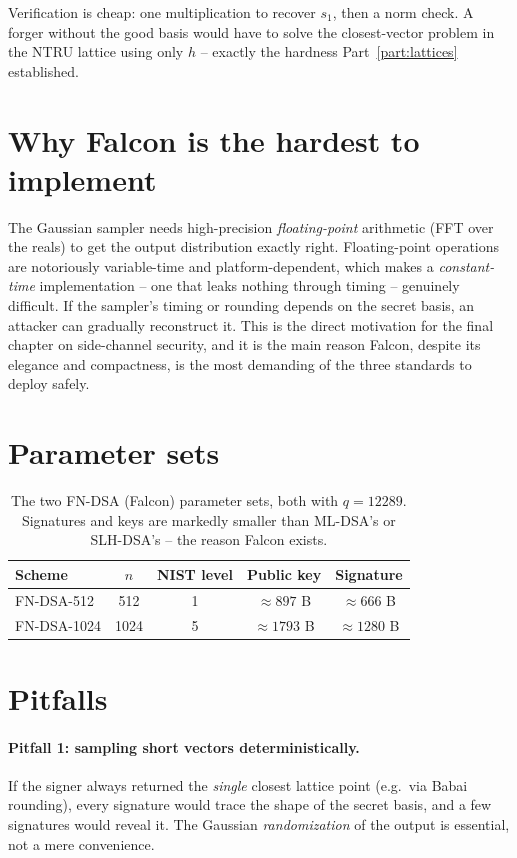 Verification is cheap: one multiplication to recover $s_1$, then a norm check. A forger without the good basis would have to solve the closest-vector problem in the NTRU lattice using only $h$ -- exactly the hardness Part~\ref{part:lattices} established.

\section{Why Falcon is the hardest to implement}

The Gaussian sampler needs high-precision \emph{floating-point} arithmetic (FFT over the reals) to get the output distribution exactly right. Floating-point operations are notoriously variable-time and platform-dependent, which makes a \emph{constant-time} implementation -- one that leaks nothing through timing -- genuinely difficult. If the sampler's timing or rounding depends on the secret basis, an attacker can gradually reconstruct it. This is the direct motivation for the final chapter on side-channel security, and it is the main reason Falcon, despite its elegance and compactness, is the most demanding of the three standards to deploy safely.

\section{Parameter sets}

\begin{table}[H]
\centering
\begin{tabular}{lcccc}
\toprule
Scheme & $n$ & NIST level & Public key & Signature \\
\midrule
FN-DSA-512  & 512  & 1 & $\approx 897$ B & $\approx 666$ B \\
FN-DSA-1024 & 1024 & 5 & $\approx 1793$ B & $\approx 1280$ B \\
\bottomrule
\end{tabular}
\caption{The two FN-DSA (Falcon) parameter sets, both with $q=12289$. Signatures and keys are markedly smaller than ML-DSA's or SLH-DSA's -- the reason Falcon exists.}
\end{table}

\section{Pitfalls}

\paragraph{Pitfall 1: sampling short vectors deterministically.}
If the signer always returned the \emph{single} closest lattice point (e.g.\ via Babai rounding), every signature would trace the shape of the secret basis, and a few signatures would reveal it. The Gaussian \emph{randomization} of the output is essential, not a mere convenience.

